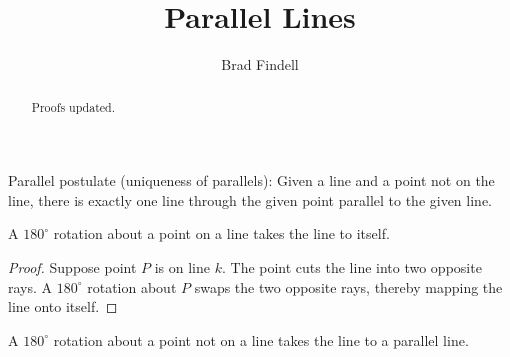 \documentclass[nooutcomes]{ximera}
\title{Parallel Lines}
\author{Brad Findell}
\begin{document}
\begin{abstract}
Proofs updated. 
\end{abstract}
\maketitle

\begin{axiom}
Parallel postulate (uniqueness of parallels):  Given a line and a point not on the line, there is exactly one line through the given point parallel to the given line.  
\end{axiom}

\begin{theorem}
A $180^\circ$ rotation about a point on a line takes the line to itself. 
\end{theorem}

\begin{proof}
Suppose point $P$ is on line $k$.  The point cuts the line into two opposite rays.  A $180^\circ$ rotation about $P$ swaps the two opposite rays, thereby mapping the line onto itself.  
\end{proof}

\begin{theorem}
A $180^\circ$ rotation about a point not on a line takes the line to a parallel line.
\end{theorem}
\end{document}
